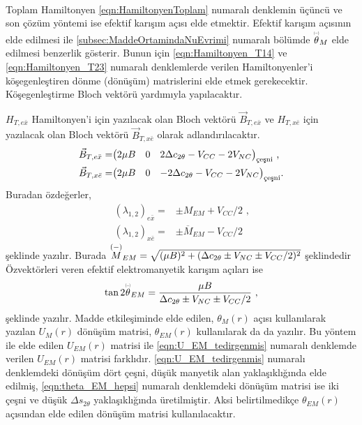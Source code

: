 \paragraph{}
Toplam Hamiltonyen \eqref{eqn:HamiltonyenToplam} numaralı denklemin üçüncü ve son çözüm yöntemi ise efektif karışım açısı elde etmektir. Efektif karışım açısının elde edilmesi ile \ref{subsec:MaddeOrtamindaNuEvrimi} numaralı bölümde $ \barparen{\theta}_{M} $ elde edilmesi benzerlik gösterir. Bunun için \eqref{eqn:Hamiltonyen_T14} ve \eqref{eqn:Hamiltonyen_T23} numaralı denklemlerde verilen Hamiltonyenler'i köşegenleştiren dönme (dönüşüm) matrislerini elde etmek gerekecektir. Köşegenleştirme Bloch vektörü yardımıyla yapılacaktır.

$ H_{T,e\bar{x}} $ Hamiltonyen'i için yazılacak olan Bloch vektörü $ \vec{B}_{T,e\bar{x}} $ ve $ H_{T,x\bar{e}} $ için yazılacak olan Bloch vektörü $ \vec{B}_{T,x\bar{e}} $ olarak adlandırılacaktır.
\begin{align}
	\vec{B}_{T,e\bar{x}} =& \mqty(2\mu B & 0 & 2 \Delta c_{2\theta} - V_{CC}-2V_{NC})_{\text{çeşni}} \text{ ,}\\ \vec{B}_{T,x\bar{e}} =& \mqty(2\mu B & 0 & -2 \Delta c_{2\theta} - V_{CC}-2V_{NC})_{\text{çeşni}} \text{.}
\end{align}
Buradan özdeğerler,
\begin{align}
	\label{eqn:Ozdeger_EMetkilesim14}(\lambda_{1,2})_{e\bar{x}} =& \pm M_{EM} + V_{CC}/2 \text{ ,} \\
	\label{eqn:Ozdeger_EMetkilesim23}(\lambda_{1,2})_{x\bar{e}} =& \pm \overline{M}_{EM} - V_{CC}/2
\end{align}
şeklinde yazılır. Burada $ \overset{(-)}{M}_{EM} = \sqrt{(\mu B)^{2} + (\Delta c_{2\theta} \pm V_{NC} \pm V_{CC}/2)^{2}} $ şeklindedir Özvektörleri veren efektif elektromanyetik karışım açıları ise 
\begin{equation}\label{eqn:theta_EM_hepsi}
	\tan 2\barparen{\theta}_{EM} = \frac{\mu B}{\Delta c_{2\theta} \pm V_{NC} \pm V_{CC}/2} \text{ ,}
\end{equation}
şeklinde yazılır. Madde etkileşiminde elde edilen, $ \theta_{M}(r) $ açısı kullanılarak yazılan $ U_{M}(r) $ dönüşüm matrisi, $ \theta_{EM}(r) $ kullanılarak da da yazılır. Bu yöntem ile elde edilen $ U_{EM}(r) $ matrisi ile \eqref{eqn:U_EM_tedirgenmis} numaralı denklemde verilen $ U_{EM}(r) $ matrisi farklıdır. \eqref{eqn:U_EM_tedirgenmis} numaralı denklemdeki dönüşüm dört çeşni, düşük manyetik alan yaklaşıklığında elde edilmiş, \eqref{eqn:theta_EM_hepsi} numaralı denklemdeki dönüşüm matrisi ise iki çeşni ve düşük $ \Delta s_{2\theta} $ yaklaşıklığında üretilmiştir. Aksi belirtilmedikçe $ \theta_{EM}(r) $ açısından elde edilen dönüşüm matrisi kullanılacaktır.
	
